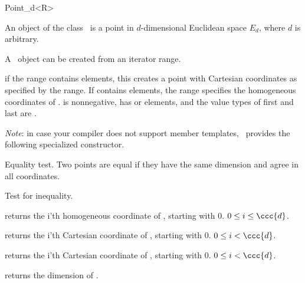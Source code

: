 \begin{ccRefClass}{Point_d<R>}

\ccDefinition

An object of the class \ccClassTemplateName\ is a point in $d$-dimensional
Euclidean space $E_d$, where $d$ is arbitrary. 


\ccCreation
{}

A \ccClassTemplateName\ object can be created from an iterator range. 

	{if the range \ccc{[first,last)} contains  elements,
	 this creates a point with Cartesian coordinates as specified by 
	 the range. If \ccc{[first,last)} contains  elements,
	 the range specifies the homogeneous coordinates of \ccVar. 
	 \ccPrecond {} is nonnegative, \ccc{[first,last)} has 
	  or  elements, and the value types of first
	 and last are .}

\emph{Note}: in case your compiler does not support member templates, \cgal\
provides the following specialized constructor.


\ccOperations

	{Equality test. Two points are equal if they have the same
	 dimension and agree in all coordinates.}

	{Test for inequality.}

	{returns the i'th homogeneous coordinate of \ccVar, starting
	 with 0. \ccPrecond $0\leq i\leq \ccc{d}$.}

	{returns the i'th Cartesian coordinate of \ccVar, starting
	 with 0. \ccPrecond $0\leq i < \ccc{d}$.}

	{returns the i'th Cartesian coordinate of \ccVar, starting
	with 0. \ccPrecond $0\leq i < $.}

	{returns the dimension \ccc{d} of \ccVar.}

\ccSeeAlso
{}

\end{ccRefClass}%
